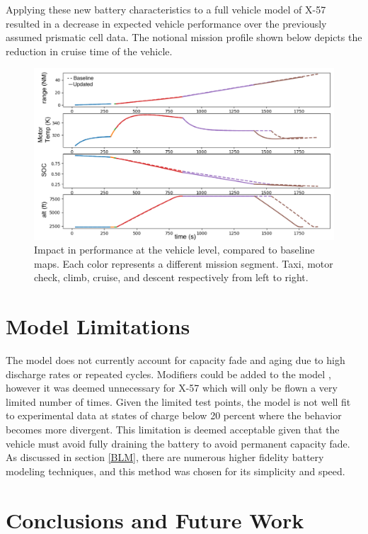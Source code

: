 \documentclass[]{aiaa-tc}%
\begin{document}
Applying these new battery characteristics to a full vehicle model of X-57 resulted in a decrease in expected vehicle performance over the previously assumed prismatic cell data. The notional mission profile shown below depicts the reduction in cruise time of the vehicle. 

\begin{figure}[!htb]
	\centering
	\includegraphics[width=1.0\textwidth]{figures/batt_mission_axes2.png}
	\caption{Impact in performance at the vehicle level, compared to baseline maps. Each color represents a different mission segment. Taxi, motor check, climb, cruise, and descent respectively from left to right.}
	\label{fig:Mission}
\end{figure}

\section{Model Limitations}
The model does not currently account for capacity fade and aging due to high discharge rates or repeated cycles. Modifiers could be added to the model \cite{Ning}, however it was deemed unnecessary for X-57 which will only be flown a very limited number of times. Given the limited test points, the model is not well fit to experimental data at states of charge below 20 percent where the behavior becomes more divergent. This limitation is deemed acceptable given that the vehicle must avoid fully draining the battery to avoid permanent capacity fade. As discussed in section \ref{BLM}, there are numerous higher fidelity battery modeling techniques, and this method was chosen for its simplicity and speed.


\section{Conclusions and Future Work}
\end{document}
